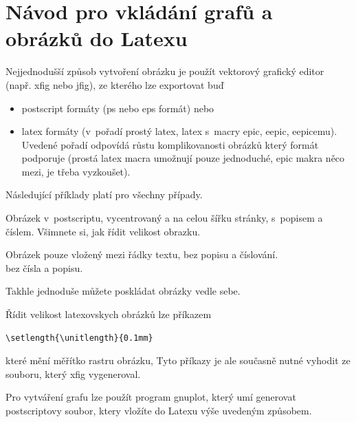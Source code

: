 \documentclass[12pt]{article}
\begin{document}


       

\appendix

\section{Návod pro vkládání grafů a obrázků do Latexu}

Nejjednodušší způsob vytvoření obrázku je použít vektorový grafický
editor (např. xfig nebo jfig), ze kterého lze exportovat buď
\begin{itemize}
\item postscript formáty (ps nebo eps formát) nebo
\item latex formáty (v~pořadí prostý latex, latex s~macry epic, eepic, eepicemu). Uvedené pořadí odpovídá růstu
komplikovanosti obrázků který formát podporuje (prostá latex macra
umožnují pouze jednoduché, epic makra něco mezi, je třeba
vyzkoušet).

\end{itemize}
Následující příklady platí pro všechny případy.

Obrázek v~postscriptu, vycentrovaný a na celou šířku stránky,
s~popisem a číslem. Všimnete si, jak řídit velikost obrazku.

Obrázek pouze vložený mezi řádky textu, bez popisu a číslování.\\


bez čísla a popisu.

Takhle jednoduše můžete poskládat obrázky vedle sebe.

Řídit velikost latexovskych obrázků lze příkazem
\begin{verbatim}
\setlength{\unitlength}{0.1mm}
\end{verbatim}
které mění měřítko rastru obrázku, Tyto příkazy je ale současně
nutné vyhodit ze souboru, který xfig vygeneroval.

Pro vytváření grafu lze použít program gnuplot, který umí generovat
postscriptovy soubor, ktery vložíte do Latexu výše uvedeným
způsobem.
\end{document}

